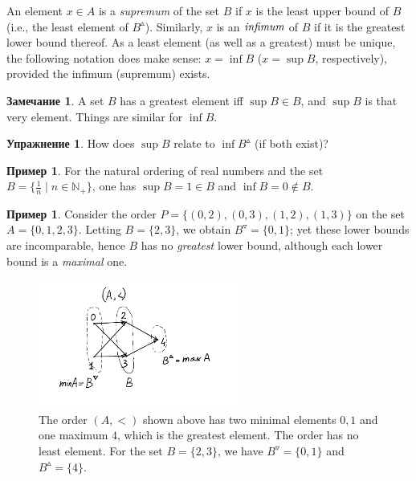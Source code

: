\documentclass[12pt,notitlepage]{article}
\theoremstyle{plain}
\theoremstyle{definition}
\newtheorem{exc}[thm]{Упражнение}
\newtheorem{exm}[thm]{Пример}
\newtheorem{rem}[thm]{Замечание}
\theoremstyle{plain}
\newcommand{\N}{\mathbb{N}}
\newcommand{\1}{\mathbf{1}}
\newcommand{\0}{\mathbf{0}}
\begin{document}
An element $x \in A$ is a \emph{supremum} of the set $B$ if $x$ is the least upper bound of $B$ (i.e., the least element of $B^\vartriangle$). Similarly, $x$ is an $\emph{infimum}$ of $B$ if it is the greatest lower bound thereof. As a least element (as well as a greatest) must be unique, the following notation does make sense:  $x = \inf B$ ($x = \sup B$, respectively), provided the infimum (supremum) exists.

\begin{rem}
	A set $B$ has a greatest element iff $\sup B \in B$, and $\sup B$ is that very element. Things are similar for $\inf B$.
\end{rem}
\begin{exc}
	How does $\sup B$ relate to $\inf B^\vartriangle$ (if both exist)?
\end{exc}

\begin{exm}
	For the natural ordering of real numbers and the set $B = \{ \frac{1}{n} \mid n \in \N_+ \}$, one has $\sup B = 1 \in B$ and $\inf B = 0 \notin B$.
\end{exm}

\begin{exm}
	Consider the order $P = \{(0,2), (0,3), (1,2), (1,3)\}$ on the set $A = \{0,1,2,3\}$. Letting $B = \{2,3\}$, we obtain $B^\triangledown = \{ 0, 1\}$; yet these lower bounds are incomparable, hence $B$ has no \emph{greatest} lower bound, although each lower bound is a \emph{maximal} one.
\end{exm}

\begin{figure}[h]
	\centering
	\includegraphics*[width=0.6\textwidth]{min_max.pdf}
	\caption{The order $(A, <)$ shown above has two minimal elements $0, 1$ and one maximum $4$, which is the greatest element. The order has no least element. For the set $B = \{2,3\}$, we have $B^\triangledown = \{ 0, 1\}$ and $B^\vartriangle = \{ 4\}$.}
\end{figure}
\end{document}
